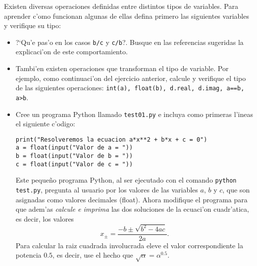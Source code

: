 \documentclass[11pt]{exam}
\begin{document}
\begin{questions}
\begin{parts}
\end{parts}
\item Existen diversas operaciones definidas entre distintos tipos de variables. Para aprender c'omo funcionan algunas de ellas defina primero las siguientes variables y verifique su tipo:
\begin{itemize}

\begin{verbatim}
a = 3.14
b = 2
c = 5
d = 6+2j
e = "hola "
f = "mechones"
g = True
\end{verbatim}
A continuaci'on imprima el valor y el tipo del resultado de las siguientes operaciones: \texttt{a+b, a+d, a+e, b+c, b+d, b+e, f+e, e+f, a*b, a*d, a*e, b*c, b*d, c*e, e*f, a**b, a**d, a**e, b**c, e**a, e**b, e**f, a/b, a/d, a/e, b/c, b/d, b/e, c/b, d/a, d/b, e/a, e/b, e/f,  a*g, b*g, not(g), g and False, g and True, g or False, g or True}. ?`Cu'ales de estas operaciones no est'an definidas?
\item ?`Qu'e pas'o en los casos \texttt{b/c} y \texttt{c/b}?. Busque en las referencias sugeridas la explicaci'on de este comportamiento.
\item Tambi'en existen operaciones que transforman el tipo de variable. Por ejemplo, como continuaci'on del ejercicio anterior, calcule y verifique el tipo de las siguientes operaciones: \texttt{int(a), float(b), d.real, d.imag, a==b, a>b}.

\item Cree un programa Python llamado \texttt{test01.py} e incluya como primeras l'ineas el siguiente c'odigo:

\begin{verbatim}
print("Resolveremos la ecuacion a*x**2 + b*x + c = 0")
a = float(input("Valor de a = "))
b = float(input("Valor de b = "))
c = float(input("Valor de c = "))
\end{verbatim}

Este peque\~no programa Python, al ser ejecutado con el comando \texttt{python test.py}, pregunta al usuario por los valores de las variables $a$, $b$ y $c$, que son asignadas como valores decimales (float). Ahora modifique el programa para que adem'as \textit{calcule e imprima} las dos soluciones de la ecuaci'on cuadr'atica, es decir, los valores 
\begin{equation}
x_\pm=\frac{-b\pm\sqrt{b^2-4ac}}{2a}.
\end{equation}
Para calcular la raiz cuadrada involucrada eleve el valor correspondiente la potencia $0.5$, es decir, use el hecho que $\sqrt{\alpha}=\alpha^{0.5}$.
\end{itemize}


\end{questions}
\end{document}
